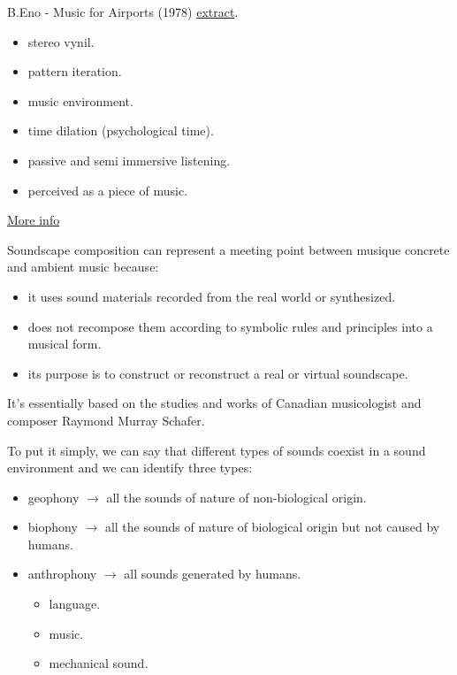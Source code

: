 B.Eno - Music for Airports (1978) \href{suoni/eno.mp3}{extract}.

\begin{itemize}
\tightlist
\item stereo vynil. 
\item pattern iteration.
\item music environment. 
\item time dilation (psychological time). 
\item passive and semi immersive listening. 
\item perceived as a piece of music.
\end{itemize}

\href{img/eno.pdf}{More info}

Soundscape composition can represent a meeting point between musique concrete and ambient music because:

\begin{itemize}
\tightlist
\item it uses sound materials recorded from the real world or synthesized.
\item does not recompose them according to symbolic rules and principles into a musical form.
\item its purpose is to construct or reconstruct a real or virtual soundscape.
\end{itemize}

It's essentially based on the studies and works of Canadian musicologist and composer Raymond Murray Schafer.

To put it simply, we can say that different types of sounds coexist in a sound environment and we can identify three types:

\begin{itemize}
\tightlist
\item geophony \(\rightarrow\) all the sounds of nature of non-biological origin.
\item biophony \(\rightarrow\) all the sounds of nature of biological origin but not caused by humans.
\item anthrophony \(\rightarrow\) all sounds generated by humans.
  \begin{itemize}
  \tightlist
  \item language.
  \item music.
  \item mechanical sound.
  \end{itemize}
\end{itemize}

